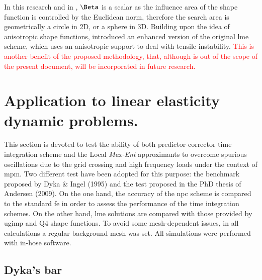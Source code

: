 \documentclass[preprint,12pt,a4paper]{elsarticle}
\newcommand{\PNA}[1]{
  \textcolor{red}{{#1}}
}
\begin{document}
In this research and in \cite{Arroyo2006}, $\Beta$ is a scalar as the
influence area of the shape function is controlled by the Euclidean
norm, therefore the search area is geometrically a circle in 2D, or a
sphere in 3D. Building upon the idea of anisotropic shape functions,
\cite{Kochmann2019} introduced an enhanced version of the original
\acrshort{lme} scheme, which uses an anisotropic support to deal with 
tensile instability.\PNA{This is another benefit of the proposed methodology, that, although is out of the scope of the
present document, will be incorporated in future research.}

\section{Application to linear elasticity dynamic problems.}
\label{sec:Application-linear-elasticity-dynamic-problems}

This section is devoted to test the ability of both predictor-corrector
time integration scheme and the Local \textit{Max-Ent} approximants to
overcome spurious oscillations due to the grid crossing and high
frequency loads under the context of \acrshort{mpm}. Two different test have
been adopted for this purpose: the benchmark proposed by Dyka \& Ingel
(1995)\cite{Dyka1995} and the test proposed in the PhD thesis of
Andersen (2009)\cite{thesis_Andersen_2009}. On the one hand, the accuracy of the \acrfull{npc}
scheme is compared to the standard \acrfull{fe} in order to assess the performance of the time integration schemes. On the other hand,  \acrshort{lme} solutions
are compared with those provided by \acrfull{ugimp} and Q4 shape
functions. To avoid some mesh-dependent issues, in all
calculations a regular background mesh was set. All simulations were performed with in-hose software.

\subsection{Dyka's bar \cite{Dyka1995}}
\label{sec:dyka-bar}
\end{document}
